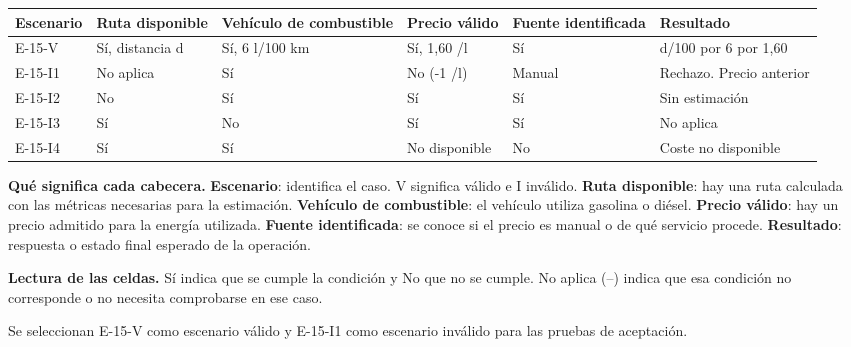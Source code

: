 \begingroup\fontsize{7.8}{11}\selectfont\setlength{\tabcolsep}{3pt}
\begin{tabularx}{\linewidth}{@{}*{6}{Y}@{}}\toprule
\textbf{Escenario} & \textbf{Ruta disponible} & \textbf{Vehículo de combustible} & \textbf{Precio válido} & \textbf{Fuente identificada} & \textbf{Resultado}\\\midrule
E-15-V & Sí, distancia d & Sí, 6 l/100 km & Sí, 1,60 \texteuro{}/l & Sí & d/100 por 6 por 1,60\\[3pt]
E-15-I1 & No aplica & Sí & No (-1 \texteuro{}/l) & Manual & Rechazo. Precio anterior\\[3pt]
E-15-I2 & No & Sí & Sí & Sí & Sin estimación\\[3pt]
E-15-I3 & Sí & No & Sí & Sí & No aplica\\[3pt]
E-15-I4 & Sí & Sí & No disponible & No & Coste no disponible\\[3pt]
\bottomrule\end{tabularx}\endgroup\par
{\fontsize{9}{11}\selectfont\textbf{Qué significa cada cabecera.} \textbf{Escenario}: identifica el caso. V significa válido e I inválido. \textbf{Ruta disponible}: hay una ruta calculada con las métricas necesarias para la estimación. \textbf{Vehículo de combustible}: el vehículo utiliza gasolina o diésel. \textbf{Precio válido}: hay un precio admitido para la energía utilizada. \textbf{Fuente identificada}: se conoce si el precio es manual o de qué servicio procede. \textbf{Resultado}: respuesta o estado final esperado de la operación.\par\textbf{Lectura de las celdas.} Sí indica que se cumple la condición y No que no se cumple. No aplica (--) indica que esa condición no corresponde o no necesita comprobarse en ese caso.\par}


Se seleccionan E-15-V como escenario válido y E-15-I1 como escenario inválido para las pruebas de aceptación.\par


